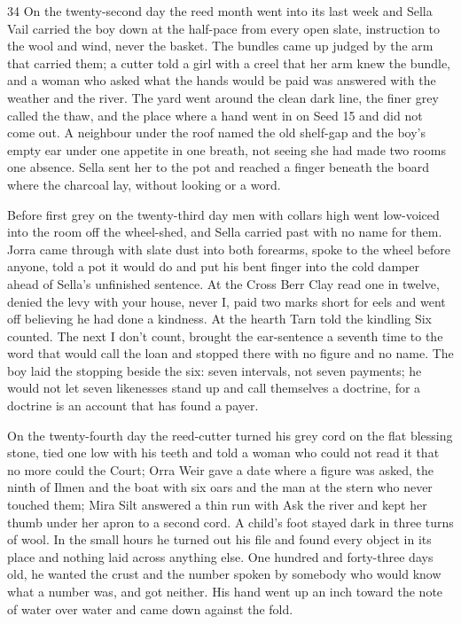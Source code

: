 \begin{CRchronicle}{34}
On the twenty-second day the reed month went into its last week and Sella Vail carried the boy down at the half-pace from every open slate, instruction to the wool and wind, never the basket. The bundles came up judged by the arm that carried them; a cutter told a girl with a creel that her arm knew the bundle, and a woman who asked what the hands would be paid was answered with the weather and the river. The yard went around the clean dark line, the finer grey called the thaw, and the place where a hand went in on Seed 15 and did not come out. A neighbour under the roof named the old shelf-gap and the boy’s empty ear under one appetite in one breath, not seeing she had made two rooms one absence. Sella sent her to the pot and reached a finger beneath the board where the charcoal lay, without looking or a word.

Before first grey on the twenty-third day men with collars high went low-voiced into the room off the wheel-shed, and Sella carried past with no name for them. Jorra came through with slate dust into both forearms, spoke to the wheel before anyone, told a pot it would do and put his bent finger into the cold damper ahead of Sella’s unfinished sentence. At the Cross Berr Clay read one in twelve, denied the levy with your house, never I, paid two marks short for eels and went off believing he had done a kindness. At the hearth Tarn told the kindling Six counted. The next I don’t count, brought the ear-sentence a seventh time to the word that would call the loan and stopped there with no figure and no name. The boy laid the stopping beside the six: seven intervals, not seven payments; he would not let seven likenesses stand up and call themselves a doctrine, for a doctrine is an account that has found a payer.

On the twenty-fourth day the reed-cutter turned his grey cord on the flat blessing stone, tied one low with his teeth and told a woman who could not read it that no more could the Court; Orra Weir gave a date where a figure was asked, the ninth of Ilmen and the boat with six oars and the man at the stern who never touched them; Mira Silt answered a thin run with Ask the river and kept her thumb under her apron to a second cord. A child’s foot stayed dark in three turns of wool. In the small hours he turned out his file and found every object in its place and nothing laid across anything else. One hundred and forty-three days old, he wanted the crust and the number spoken by somebody who would know what a number was, and got neither. His hand went up an inch toward the note of water over water and came down against the fold.
\end{CRchronicle}
